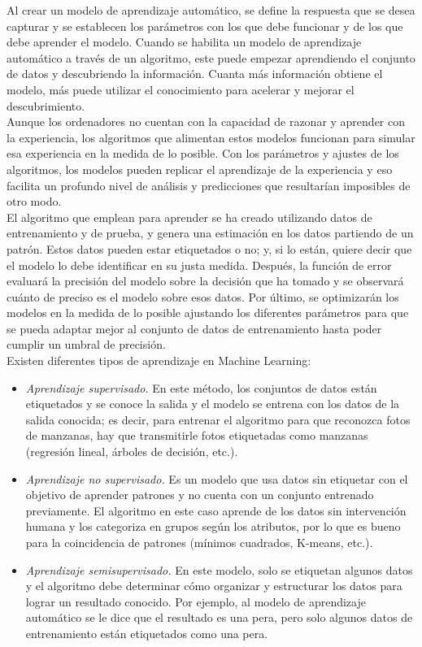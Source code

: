 Al crear un modelo de aprendizaje automático, se define la respuesta que se desea capturar y se establecen los parámetros con los que debe funcionar y de los que debe aprender el modelo. Cuando se habilita un modelo de aprendizaje automático a través de un algoritmo, este puede empezar aprendiendo el conjunto de datos y descubriendo la información. Cuanta más información obtiene el modelo, más puede utilizar el conocimiento para acelerar y mejorar el descubrimiento.\\ 

Aunque los ordenadores no cuentan con la capacidad de razonar y aprender con la experiencia, los algoritmos que alimentan estos modelos funcionan para simular esa experiencia en la medida de lo posible. Con los parámetros y ajustes de los algoritmos, los modelos pueden replicar el aprendizaje de la experiencia y eso facilita un profundo nivel de análisis y predicciones que resultarían imposibles de otro modo. \\

El algoritmo que emplean para aprender se ha creado utilizando datos de entrenamiento y de prueba, y genera una estimación en los datos partiendo de un patrón. Estos datos pueden estar etiquetados o no; y, si lo están, quiere decir que el modelo lo debe identificar en su justa medida. Después, la función de error evaluará la precisión del modelo sobre la decisión que ha tomado y se observará cuánto de preciso es el modelo sobre esos datos. Por último, se optimizarán los modelos en la medida de lo posible ajustando los diferentes parámetros para que se pueda adaptar mejor al conjunto de datos de entrenamiento hasta poder cumplir un umbral de precisión.\\ 



Existen diferentes tipos de aprendizaje en Machine Learning: 

\begin{itemize}
 \item \textit{Aprendizaje supervisado.} En este método, los conjuntos de datos están etiquetados y se conoce la salida y el modelo se entrena con los datos de la salida conocida; es decir, para entrenar el algoritmo para que reconozca fotos de manzanas, hay que transmitirle fotos etiquetadas como manzanas (regresión lineal, árboles de decisión, etc.).
 \item \textit{Aprendizaje no supervisado.} Es un modelo que usa datos sin etiquetar con el objetivo de aprender patrones y no cuenta con un conjunto entrenado previamente. El algoritmo en este caso aprende de los datos sin intervención humana y los categoriza en grupos según los atributos, por lo que es bueno para la coincidencia de patrones (mínimos cuadrados, K-means, etc.).
 \item \textit{Aprendizaje semisupervisado.} En este modelo, solo se etiquetan algunos datos y el algoritmo debe determinar cómo organizar y estructurar los datos para lograr un resultado conocido. Por ejemplo, al modelo de aprendizaje automático se le dice que el resultado es una pera, pero solo algunos datos de entrenamiento están etiquetados como una pera.
\end{itemize}\


